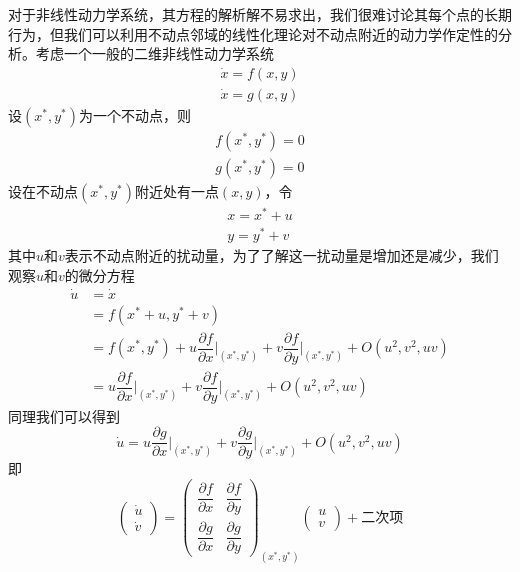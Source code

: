 对于非线性动力学系统，其方程的解析解不易求出，我们很难讨论其每个点的长期行为，但我们可以利用不动点邻域的线性化理论\cite{strogatz2001nonlinear}对不动点附近的动力学作定性的分析。考虑一个一般的二维非线性动力学系统
\begin{equation}
    \begin{aligned}
        \dot{x}=f(x,y)\\
        \dot{x}=g(x,y)
    \end{aligned}
\end{equation}
设$(x^*,y^*)$为一个不动点，则
\begin{equation}
    \begin{aligned}
        f(x^*,y^*)=0\\
        g(x^*,y^*)=0
    \end{aligned}
\end{equation}
设在不动点$(x^*,y^*)$附近处有一点$(x,y)$，令
\begin{equation}
    \begin{aligned}
        x=x^*+u\\
        y=y^*+v
    \end{aligned}
\end{equation}
其中$u$和$v$表示不动点附近的扰动量，为了了解这一扰动量是增加还是减少，我们观察$u$和$v$的微分方程
\begin{equation}
    \begin{aligned}
        \dot{u}&=\dot{x}\\
               &=f(x^*+u,y^*+v)\\
               &=f(x^*,y^*)+u\dfrac{\partial f}{\partial x}\Big|_{(x^*,y^*)}+v\dfrac{\partial f}{\partial y}\Big|_{(x^*,y^*)}+O(u^2,v^2,uv)\\
               &=u\dfrac{\partial f}{\partial x}\Big|_{(x^*,y^*)}+v\dfrac{\partial f}{\partial y}\Big|_{(x^*,y^*)}+O(u^2,v^2,uv)
    \end{aligned}
\end{equation}
同理我们可以得到
\begin{equation}
    \dot{u}=u\dfrac{\partial g}{\partial x}\Big|_{(x^*,y^*)}+v\dfrac{\partial g}{\partial y}\Big|_{(x^*,y^*)}+O(u^2,v^2,uv)
\end{equation}
即
\begin{equation}  
    \begin{pmatrix}
        \dot{u}\\
        \dot{v}
    \end{pmatrix}=
    \begin{pmatrix}
        \dfrac{\partial f}{\partial x} & \dfrac{\partial f}{\partial y} \\
        \dfrac{\partial g}{\partial x} & \dfrac{\partial g}{\partial y}
    \end{pmatrix}_{(x^*,y^*)}
    \begin{pmatrix}
        u\\v
    \end{pmatrix}+\text{二次项}
\end{equation}
